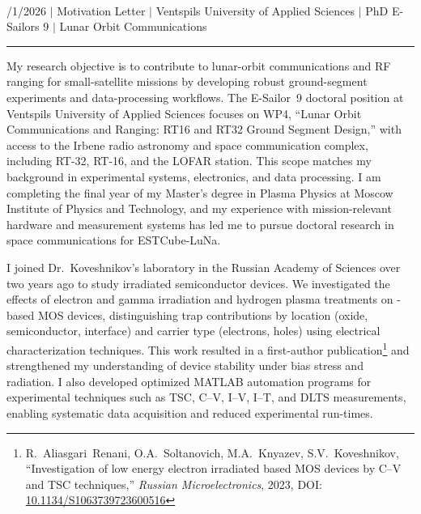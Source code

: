 \documentclass[a4paper,12pt]{article}
\begin{document}
{\centering
  {\scshape {}} \\
  {\fontsize{10}{10}/1/2026} $|$
  {\fontsize{10}{10}\selectfont Motivation Letter} $|$
  {\fontsize{10}{10}\selectfont Ventspils University of Applied Sciences} $|$
  {\fontsize{10}{10}\selectfont PhD E-Sailors 9} $|$
  {\fontsize{10}{10}\selectfont Lunar Orbit Communications}
\par}
\vspace{-15pt}
\noindent\rule{\textwidth}{0.5pt}

\vspace{-5pt}

My research objective is to contribute to lunar-orbit communications and RF ranging for small-satellite missions by developing robust ground-segment experiments and data-processing workflows. The E-Sailor~9 doctoral position at Ventspils University of Applied Sciences focuses on WP4, ``Lunar Orbit Communications and Ranging: RT16 and RT32 Ground Segment Design,'' with access to the Irbene radio astronomy and space communication complex, including RT-32, RT-16, and the LOFAR station. This scope matches my background in experimental systems, electronics, and data processing. I am completing the final year of my Master's degree in Plasma Physics at Moscow Institute of Physics and Technology, and my experience with mission-relevant hardware and measurement systems has led me to pursue doctoral research in space communications for ESTCube-LuNa.

I joined Dr.\ Koveshnikov's laboratory in the Russian Academy of Sciences over two years ago to study irradiated semiconductor devices. We investigated the effects of electron and gamma irradiation and hydrogen plasma treatments on -based MOS devices, distinguishing trap contributions by location (oxide, semiconductor, interface) and carrier type (electrons, holes) using electrical characterization techniques. This work resulted in a first-author publication\footnote{R.~Aliasgari~Renani, O.A.~Soltanovich, M.A.~Knyazev, S.V.~Koveshnikov, ``Investigation of low energy electron irradiated  based MOS devices by C--V and TSC techniques,'' \textit{Russian Microelectronics}, 2023, DOI: \href{https://doi.org/10.1134/S1063739723600516}{10.1134/S1063739723600516}} and strengthened my understanding of device stability under bias stress and radiation. I also developed optimized MATLAB automation programs for experimental techniques such as TSC, C--V, I--V, I--T, and DLTS measurements, enabling systematic data acquisition and reduced experimental run-times.
\end{document}
